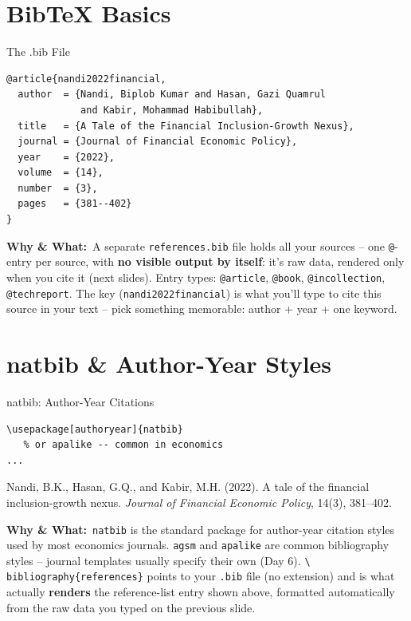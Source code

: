 \documentclass[11pt,aspectratio=169]{beamer}
\newcommand{\whybox}[1]{%
  \vspace{2pt}
  {\scriptsize\raggedright\textcolor{red!55!black}{\textbf{Why \& What:}}~#1\par}
}
\begin{document}
\section{BibTeX Basics}

\begin{frame}[fragile]{The .bib File}
  \begin{lstlisting}
@article{nandi2022financial,
  author  = {Nandi, Biplob Kumar and Hasan, Gazi Quamrul
             and Kabir, Mohammad Habibullah},
  title   = {A Tale of the Financial Inclusion-Growth Nexus},
  journal = {Journal of Financial Economic Policy},
  year    = {2022},
  volume  = {14},
  number  = {3},
  pages   = {381--402}
}
  \end{lstlisting}
  \whybox{A separate \texttt{references.bib} file holds all your
  sources -- one \texttt{@}-entry per source, with \textbf{no visible
  output by itself}: it's raw data, rendered only when you cite it
  (next slides). Entry types: \texttt{@article}, \texttt{@book},
  \texttt{@incollection}, \texttt{@techreport}. The key
  (\texttt{nandi2022financial}) is what you'll type to cite this
  source in your text -- pick something memorable: author + year + one
  keyword.}
\end{frame}

\section{natbib \& Author-Year Styles}

\begin{frame}[fragile]{natbib: Author-Year Citations}
  \begin{lstlisting}
\usepackage[authoryear]{natbib}
   % or apalike -- common in economics
...

  \end{lstlisting}
  \begin{outputbox}
    \footnotesize
    Nandi, B.K., Hasan, G.Q., and Kabir, M.H. (2022). A tale of the
    financial inclusion-growth nexus. \textit{Journal of Financial
    Economic Policy}, 14(3), 381--402.
  \end{outputbox}
  \whybox{\texttt{natbib} is the standard package for author-year
  citation styles used by most economics journals. \texttt{agsm} and
  \texttt{apalike} are common bibliography styles -- journal templates
  usually specify their own (Day 6). \texttt{\textbackslash
  bibliography\{references\}} points to your \texttt{.bib} file (no
  extension) and is what actually \textbf{renders} the reference-list
  entry shown above, formatted automatically from the raw data you
  typed on the previous slide.}
\end{frame}
\end{document}
